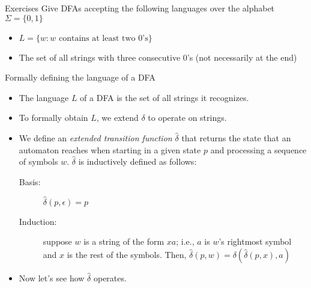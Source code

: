 \documentclass{prosper}%
\begin{document}
\begin{slide}{Exercises}
Give DFAs accepting the following languages over the alphabet $\Sigma=\{0,1\}$
\begin{itemize}
\item $L=\{w : w \mbox{ contains at least two 0's}\}$
\item The set of all strings with three consecutive 0's (not necessarily at the end)
\end{itemize}
\end{slide}

\begin{slide}{Formally defining the language of a DFA}
\begin{itemize}
\item The language $L$ of a DFA is the set of all strings it recognizes.
\item To formally obtain $L$, we extend $\delta$ to operate on strings.
\item We define an {\em extended transition function} $\hat{\delta}$ that returns the state that an automaton reaches when starting in a given state $p$ and processing a sequence of symbols $w$. $\hat{\delta}$ is inductively defined as follows:
\begin{description}
\item[Basis:] $\hat{\delta}(p, \epsilon) = p$
\item[Induction:] suppose $w$ is a string of the form $xa$; i.e., $a$ is $w$'s rightmost symbol and $x$ is the rest of the symbols. Then, $\hat{\delta}(p,w) = \delta(\hat{\delta}(p, x), a)$
\end{description}
\item Now let's see how $\hat{\delta}$ operates.
\end{itemize}
\end{slide}
\end{document}
